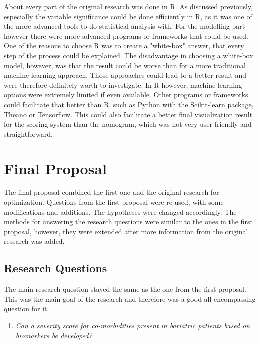 \documentclass[10pt,a4paper]{report}
\begin{document}
	About every part of the original research was done in R. As discussed previously, especially the variable significance could be done efficiently in R, as it was one of the more advanced tools to do statistical analysis with. For the modelling part however there were more advanced programs or frameworks that could be used. One of the reasons to choose R was to create a "white-box" answer, that every step of the process could be explained. The disadvantage in choosing a white-box model, however, was that the result could be worse than for a more traditional machine learning approach. Those approaches could lead to a better result and were therefore definitely worth to investigate. In R however, machine learning options were extremely limited if even available. Other programs or frameworks could facilitate that better than R, such as Python with the Scikit-learn package, Theano or Tensorflow. This could also facilitate a better final visualization result for the scoring system than the nomogram, which was not very user-friendly and straightforward.
	
	\clearpage
	
	\section{Final Proposal}
	\label{sec:FinalProposal}
	
	The final proposal combined the first one and the original research for optimization. Questions from the first proposal were re-used, with some modifications and additions. The hypotheses were changed accordingly. The methods for answering the research questions were similar to the ones in the first proposal, however, they were extended after more information from the original research was added. 
	
	\subsection{Research Questions}
	
	The main research question stayed the same as the one from the first proposal. This was the main goal of the research and therefore was a good all-encompassing question for it. 
	
	\begin{enumerate}
		\item[] \emph{Can a severity score for co-morbidities present in bariatric patients based on biomarkers be developed?}
	\end{enumerate}
	
\end{document}
